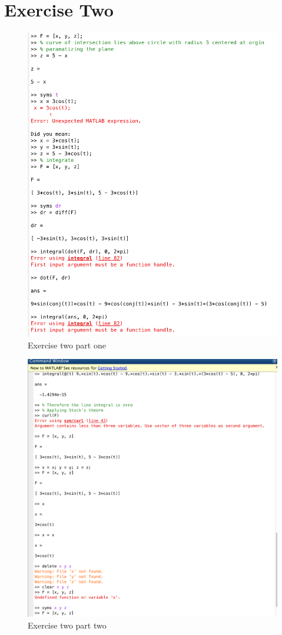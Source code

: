 \documentclass[11pt]{article}
\begin{document}
\section*{Exercise Two}
\begin{figure}[H]
	\includegraphics[width=\textwidth]{Prob2A}
	\caption*{Exercise two part one}
\end{figure}
\begin{figure}[H]
	\includegraphics[width=\textwidth]{Prob2B}
	\caption*{Exercise two part two}
\end{figure}
\end{document}
